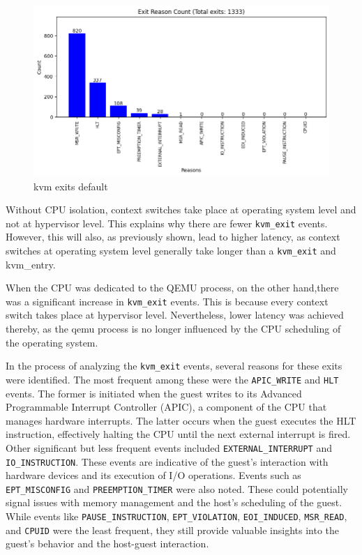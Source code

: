 \documentclass[MMR,Master,english]{twbook}
\begin{document}
\begin{figure}[H]
	\centering
	\includegraphics[width=1.0\columnwidth]{img/kvm_exit_vapic.png}
	\caption[kvm exits default]{kvm exits default}
	\label{fig:kvm_exit_vapic}
\end{figure}
\clearpage

\noindent Without CPU isolation, context switches take place at operating system level and not at hypervisor level. This explains why there are fewer \texttt{kvm\_exit} events. However, this will also, as previously shown, lead to higher latency, as context switches at operating system level generally take longer than a \texttt{kvm\_exit} and kvm\_entry.

\noindent When the CPU was dedicated to the QEMU process, on the other hand,there was a significant increase in \texttt{kvm\_exit} events. This is because every context switch takes place at hypervisor level. Nevertheless, lower latency was achieved thereby, as the qemu process is no longer influenced by the CPU scheduling of the operating system.

\noindent In the process of analyzing the \texttt{kvm\_exit} events, several reasons for these exits were identified. The most frequent among these were the \texttt{APIC\_WRITE} and \texttt{HLT} events. The former is initiated when the guest writes to its Advanced Programmable Interrupt Controller (APIC), a component of the CPU that manages hardware interrupts. The latter occurs when the guest executes the HLT instruction, effectively halting the CPU until the next external interrupt is fired. Other significant but less frequent events included \texttt{EXTERNAL\_INTERRUPT} and \texttt{IO\_INSTRUCTION}. These events are indicative of the guest's interaction with hardware devices and its execution of I/O operations. Events such as \texttt{EPT\_MISCONFIG} and \texttt{PREEMPTION\_TIMER} were also noted. These could potentially signal issues with memory management and the host's scheduling of the guest. While events like \texttt{PAUSE\_INSTRUCTION}, \texttt{EPT\_VIOLATION}, \texttt{EOI\_INDUCED}, \texttt{MSR\_READ}, and \texttt{CPUID} were the least frequent, they still provide valuable insights into the guest's behavior and the host-guest interaction.
\end{document}
